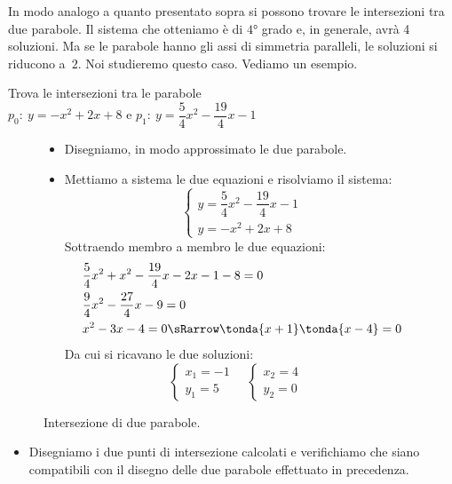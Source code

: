 In modo analogo a quanto presentato sopra si possono trovare le intersezioni
tra due parabole. Il sistema che otteniamo è di \(4\text{°}\) grado e, in
generale, avrà 4 soluzioni. Ma se le parabole hanno gli assi di simmetria
paralleli, le soluzioni si riducono a~\(2\). Noi studieremo questo caso.
Vediamo un esempio.

\begin{esempio}
 Trova le intersezioni tra le parabole \\
 \(p_0:~y=-x^2+2x+8\) e
 \(p_1:~y=\dfrac{5}{4}x^2-\dfrac{19}{4}x-1\)

\begin{figure}[h!]
\begin{minipage}{.63\textwidth}
 \begin{itemize}
  \item Disegniamo, in modo approssimato le due parabole.
  \item Mettiamo a sistema le due equazioni e risolviamo il sistema:
\[\left\{\begin{array}{l}
  y=\dfrac{5}{4}x^2-\dfrac{19}{4}x-1\\
  y=-x^2+2x+8
\end{array}\right.\]
Sottraendo membro a membro le due equazioni:
\begin{align*}
&\dfrac{5}{4}x^2+x^2-\dfrac{19}{4}x-2x-1-8=0 \\
&\dfrac{9}{4}x^2-\dfrac{27}{4}x-9=0 \\
&x^2-3x-4=0 \sRarrow \tonda{x+1}\tonda{x-4} = 0
\end{align*}
   Da cui si ricavano le due soluzioni:
\[\left\{\begin{array}{l}
  x_1=-1\\
  y_1=5
\end{array}\right. \quad
\left\{\begin{array}{l}
  x_2=4\\
  y_2=0
\end{array}\right. \quad
\]
 \end{itemize}
\end{minipage}
\hfill
\begin{minipage}{.35\textwidth}
\begin{inaccessibleblock}[Parabola di equazione \(y=x^2\).]
\centering
 \scalebox{.8}{\intersezioniparabole}
  \caption{Intersezione di due parabole.} \label{fig:parabola_parabolaparabola}
\end{inaccessibleblock}
\end{minipage}
\end{figure}
\begin{itemize}
  \item Disegniamo i due punti di intersezione calcolati e
verifichiamo che siano compatibili con il disegno delle due parabole
effettuato in precedenza.
\end{itemize}

\end{esempio}

